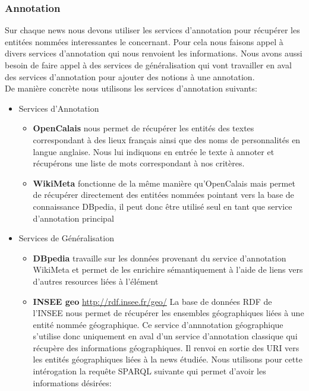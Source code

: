 \documentclass[]{easychair}
\begin{document}
\subsubsection{Annotation }
Sur chaque news nous devons utiliser les services d'annotation pour récupérer les entitées nommées interessantes le concernant. Pour cela nous faisons appel à divers services d'annotation qui nous renvoient les informations. Nous avons aussi besoin de faire appel à des services de généralisation qui vont travailler en aval des services d'annotation pour ajouter des notions à une annotation.\\
De manière concrète nous utilisons les services d'annotation suivants:
\begin{itemize}
\item Services d'Annotation
\begin{itemize}
\item \textbf{OpenCalais} nous permet de récupérer les entités des textes correspondant à des lieux français ainsi que des noms de personnalités en langue anglaise. Nous lui indiquons en entrée le texte à annoter et récupérons une liste de mots correspondant à nos critères.
\item \textbf{WikiMeta} fonctionne de la même manière qu'OpenCalais mais permet de récupérer directement des entitées nommées pointant vers la base de connaissance DBpedia, il peut donc être utilisé seul en tant que service d'annotation principal
	
\end{itemize}

\item Services de Généralisation
\begin{itemize}
\item \textbf{DBpedia} travaille sur les données provenant du service d'annotation WikiMeta et permet de les enrichire sémantiquement à l'aide de liens vers d'autres resources liées à l'élément
\item \textbf{INSEE geo} \url{http://rdf.insee.fr/geo/} La base de données RDF de l'INSEE nous permet de récupérer les ensembles géographiques liées à une entité nommée géographique. Ce service d'annnotation géographique s'utilise donc uniquement en aval d'un service d'annotation classique qui récupère des informations géographiques. Il renvoi en sortie des URI vers les entités géographiques liées à la news étudiée. Nous utilisons pour cette intérogation la requête SPARQL suivante qui permet d'avoir les informations désirées:


\end{itemize}
\end{itemize}
\end{document}

